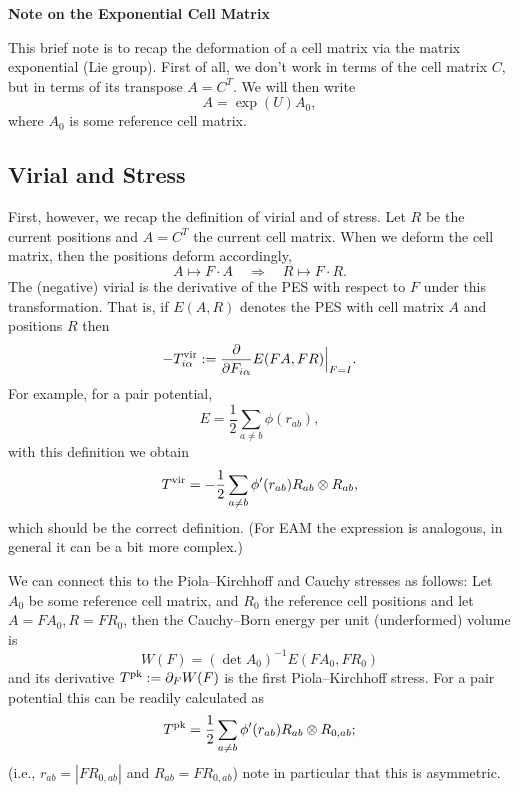 \documentclass[11pt,a4paper]{amsart}
\begin{document}
\begin{center}
   \bf Note on the Exponential Cell Matrix
\end{center}

\bigskip

This brief note is to recap the deformation of a cell matrix via the matrix
exponential (Lie group). First of all, we don't work in terms of the cell matrix
$C$, but in terms of its transpose $A = C^T$. We will then write
%
\[
  A = \exp(U) A_0,
\]
where $A_0$ is some reference cell matrix.

\subsection*{Virial and Stress}
%
First, however, we recap the definition of virial and of stress. Let $R$ be the
current positions and $A = C^T$ the current cell matrix. When we deform the cell
matrix, then the positions deform accordingly,
%
\[
   A \mapsto F \cdot A \quad \Rightarrow \quad R \mapsto F \cdot R.
\]
The (negative) virial is the derivative of the PES with respect to $F$
under this transformation. That is, if $E(A, R)$ denotes the PES with
cell matrix $A$ and positions $R$ then
\[
   - T^{\rm vir}_{i\alpha} := \frac{\partial}{\partial F_{i\alpha}}
      E( F A, F R ) \Big|_{F = I}.
\]
For example, for a pair potential,
\[
   E = \frac12 \sum_{a \neq b} \phi(r_{ab}),
\]
with this definition we obtain
\[
   T^{\rm vir} = - \frac12 \sum_{a \neq b} \phi'(r_{ab}) R_{ab} \otimes R_{ab},
\]
which should be the correct definition. (For EAM the expression is analogous, in general it can be a bit more complex.)

We can connect this to the Piola--Kirchhoff and Cauchy stresses as follows: Let
$A_0$ be some reference cell matrix, and $R_0$ the reference cell positions and
let $A = F A_0, R = F R_0$, then the Cauchy--Born energy per unit (underformed)
volume is
\[
   W(F) = (\det A_0)^{-1} E(F A_0, F R_0)
\]
and its derivative $T^{\rm pk} := \partial_F W(F)$ is the first Piola--Kirchhoff
stress. For a pair potential this can be readily calculated as
%
\begin{equation} \label{eq:Tpk-pair}
   T^{\rm pk} = \frac12 \sum_{a \neq b} \phi'(r_{ab}) R_{ab} \otimes R_{0,ab};
\end{equation}
%
(i.e., $r_{ab} = |F R_{0,ab}|$ and $R_{ab} = F R_{0,ab}$) note in particular
that this is asymmetric.
\end{document}

